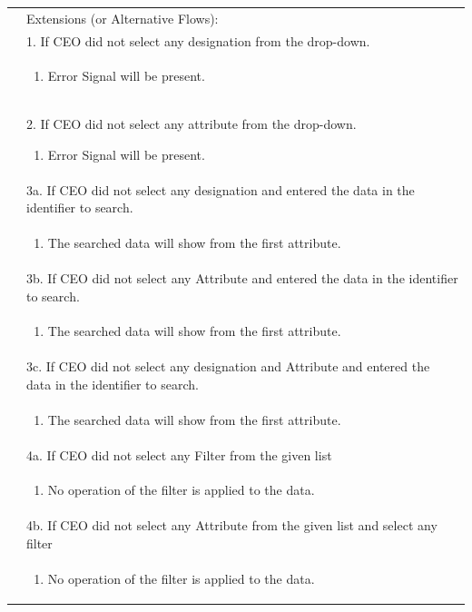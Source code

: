 \documentclass[12pt,a4paper]{report}
\begin{document}
\begin{tabular}{ | m{3cm} | m{12cm}| } \hline

&Extensions (or Alternative Flows):\\

& 1. If CEO did not select any designation from the drop-down. \\
& \begin{enumerate}
		\item Error Signal will be present.
	\end{enumerate}
\\ 

      & 2. If CEO did not select any attribute from the drop-down.
 	\begin{enumerate}
		\item Error Signal will be present.
	\end{enumerate}
\\ 
& 3a. If CEO did not select any designation and entered the data in the identifier to search. \\
& \begin{enumerate}
		\item The searched data will show from the first attribute.
	\end{enumerate}
\\
& 3b. If CEO did not select any Attribute and entered the data in the identifier to search. \\
& \begin{enumerate}
		\item The searched data will show from the first attribute.
	\end{enumerate}
\\ 
& 3c. If CEO did not select any designation and  Attribute and entered the data in the identifier to search. \\
& \begin{enumerate}
		\item The searched data will show from the first attribute.
	\end{enumerate}
\\ 

& 4a. If CEO did not select any Filter from the given list \\
& \begin{enumerate}
		\item No operation of the filter is applied to the data.
	\end{enumerate}
\\ 
& 4b. If CEO did not select any Attribute from the given list and select any filter  \\
& \begin{enumerate}
		\item No operation of the filter is applied to the data.
	\end{enumerate}
\\ 


\end{tabular}
\end{document}

